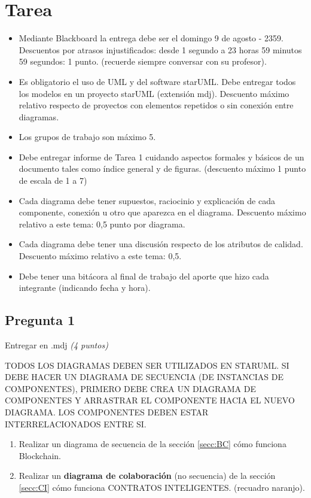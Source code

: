 \section{Tarea}
\begin{itemize}
    \item Mediante Blackboard la entrega debe ser el domingo 9 de agosto - 2359. Descuentos por atrasos injustificados: desde 1 segundo a 23 horas 59 minutos 59 segundos: 1 punto. (recuerde siempre conversar con su profesor).
    \item Es obligatorio el uso de UML y del software starUML. Debe entregar todos los modelos en un proyecto starUML (extensión mdj). Descuento máximo relativo respecto de proyectos con elementos repetidos o sin conexión entre diagramas.
    \item Los grupos de trabajo son máximo 5. 
    \item Debe entregar informe de Tarea 1 cuidando aspectos formales  y básicos de un documento tales como índice general y de figuras. (descuento máximo 1 punto de escala de 1 a 7)
    \item Cada diagrama debe tener supuestos, raciocinio y explicación de cada componente, conexión u otro que aparezca en el diagrama. Descuento máximo relativo a este tema: 0,5 punto por diagrama.
    \item Cada diagrama debe tener una discusión respecto de los atributos de calidad. Descuento máximo relativo a este tema: 0,5.
    \item Debe tener una bitácora al final de trabajo del aporte que hizo cada integrante (indicando fecha y hora). 
\end{itemize}


\subsection*{Pregunta 1}

\begin{flushright}
   Entregar en .mdj \textit{(4 puntos)}
\end{flushright}

\begin{remark}
TODOS LOS DIAGRAMAS DEBEN SER UTILIZADOS EN STARUML. SI DEBE HACER UN DIAGRAMA DE SECUENCIA (DE INSTANCIAS DE COMPONENTES), PRIMERO DEBE CREA UN DIAGRAMA DE COMPONENTES Y ARRASTRAR EL COMPONENTE HACIA EL NUEVO DIAGRAMA. LOS COMPONENTES DEBEN ESTAR INTERRELACIONADOS ENTRE SI. 
\end{remark}
\begin{tcolorbox}[colback=gray!5!white,colframe=red!60!gray,title=SOLO A PARTIR DE LA DESCRIPCION ENTREGADA ACÁ]
\begin{enumerate}
    \item Realizar un diagrama de secuencia de la sección \ref{secc:BC} cómo funciona Blockchain. 
     \item Realizar un \textbf{diagrama de colaboración} (no secuencia) de la sección \ref{secc:CI} cómo funciona CONTRATOS INTELIGENTES. (recuadro naranjo). 
\end{enumerate}

\end{tcolorbox}



